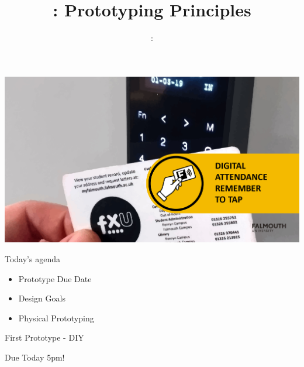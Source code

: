 \usepackage{../../beamerthemeFalmouthGamesAcademy}
\usepackage{multimedia}
\graphicspath{ {../../} }


\usepackage[normalem]{ulem}
\usepackage{wasysym}
\usepackage{graphicx} %

\usepackage{pdfpages}

\usetikzlibrary{arrows,automata}





\title{\sessionnumber: Prototyping Principles}
\subtitle{\modulecode: \moduletitle}

\begin{frame}
	\includegraphics[width=1.0\textwidth]{sign-in}
\end{frame}

\frame{\titlepage} 


\begin{frame}{Today's agenda}
	\begin{itemize}
		\item Prototype Due Date
		\item Design Goals
		\item Physical Prototyping
	\end{itemize}
\end{frame}

\begin{frame}{First Prototype - DIY}
\begin{center}
	\Huge{Due Today 5pm!}
\end{center}
\end{frame}

